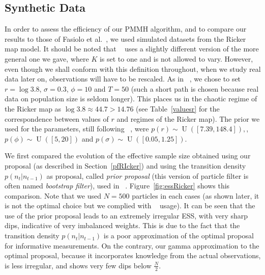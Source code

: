 \documentclass[12pt]{article}
\begin{document}
	
	\subsection{Synthetic Data}
	In order to assess the efficiency of our PMMH algorithm, and to compare our results to those of Fasiolo et al.~\cite{fasiolo2014statistical}, we used simulated datasets from the Ricker map model. It should be noted that ~\cite{fasiolo2014statistical} uses a slightly different version of the more general one we gave, where $K$ is set to one and is not allowed to vary. However, even though we shall conform with this definition throughout, when we study real data later on, observations will have to be rescaled. As in ~\cite{fasiolo2014statistical}, we chose to set $r=\log 3.8$, $\sigma=0.3$, $\phi=10$ and $T=50$ (such a short path is chosen because real data on population size is seldom longer). This places us in the  chaotic regime of the Ricker map as $\log 3.8 \approx 44.7 > 14.76$ (see Table~\ref{valuesr} for the correspondence between values of $r$ and regimes of the Ricker map). The prior we used for the parameters, still following ~\cite{fasiolo2014statistical}, were $p(r) \sim \operatorname{U}([7.39, 148.4]),$, $p(\phi) \sim \operatorname{U}([5, 20])$ and $p(\sigma) \sim \operatorname{U}([0.05, 1.25])$.
	
	We first compared the evolution of the effective sample size obtained using our proposal (as described in Section~\ref{pfRIcker}) and using the transition density $p(n_t|n_{t-1})$ as proposal, called \emph{prior proposal} (this version of particle filter is often named \emph{bootstrap filter}), used in ~\cite{fasiolo2014statistical}. Figure~\ref{fig:essRicker} shows this comparison. Note that we used $N=500$ particles in each cases (as shown later, it is not the optimal choice but we complied with ~\cite{fasiolo2014statistical} usage). It can be seen that the use of the prior proposal leads to an extremely irregular ESS, with very sharp dips, indicative of very imbalanced weights. This is due to the fact that the transition density $p(n_t|n_{t-1})$ is a poor approximation of the optimal proposal for informative measurements. On the contrary, our gamma approximation to the optimal proposal, because it incorporates knowledge from the actual observations, is less irregular, and shows very few dips below $\frac{N}{2}$.
	
\end{document}
